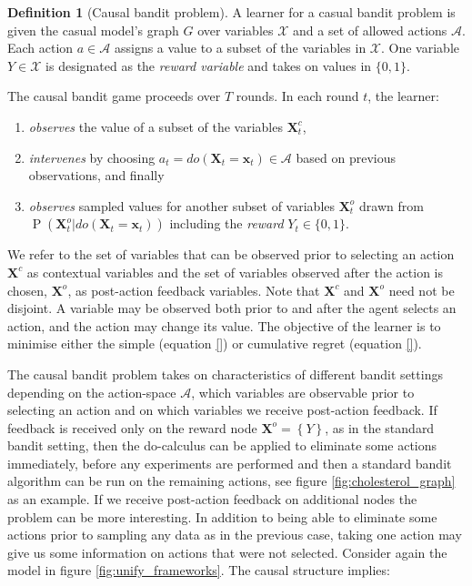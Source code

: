 \documentclass[11pt,a4paper,oneside]{book}
\newcommand{\actionspace}{\mathcal{A}}
\newcommand{\set}[1]{\left\{#1\right\}}
\renewcommand{\P}[1]{\operatorname{P}\left(#1\right)}
\renewcommand{\vec}[1]{\boldsymbol{#1}}
\theoremstyle{plain}
\theoremstyle{definition}
\newtheorem{definition}[theorem]{Definition}
\begin{document}
\vspace*{.5cm}
\begin{definition}[Causal bandit problem]
A learner for a casual bandit problem is given the casual model’s graph $G$ over variables $\mathcal{X}$ and a set of allowed actions $\actionspace$. Each action $a \in \actionspace$ assigns a value to a subset of the variables in $\mathcal{X}$. One variable $Y \in \mathcal{X}$ is designated as the \emph{reward variable} and takes on values in $\{0, 1\}$.

The causal bandit game proceeds over $T$ rounds. In each round $t$, the learner:
\begin{enumerate}
\item \emph{observes} the value of a subset of the variables $\vec{X}^c_t$,
\item \emph{intervenes} by choosing $a_t = do(\vec{X}_t = \vec{x}_t) \in \mathcal{A}$ based on previous observations, and finally
\item \emph{observes} sampled values for another subset of variables $\vec{X}^o_t$ drawn from $\P{\vec{X}^o_t | do(\vec{X}_t = \vec{x}_t)}$ including the \emph{reward} $Y_t \in \{0,1\}$.
\end{enumerate} 

We refer to the set of variables that can be observed prior to selecting an action $\vec{X}^c$ as contextual variables and the set of variables observed after the action is chosen, $\vec{X}^o$, as post-action feedback variables. Note that $\vec{X}^c$ and $\vec{X}^o$ need not be disjoint. A variable may be observed both prior to and after the agent selects an action, and the action may change its value. The objective of the learner is to minimise either the simple (equation \ref{}) or cumulative regret (equation \ref{}). 

\end{definition}

The causal bandit problem takes on characteristics of different bandit settings depending on the action-space $\actionspace$, which variables are observable prior to selecting an action and on which variables we receive post-action feedback. If feedback is received only on the reward node $\vec{X}^o = \set{Y}$, as in the standard bandit setting, then the do-calculus can be applied to eliminate some actions immediately, before any experiments are performed and then a standard bandit algorithm can be run on the remaining actions, see figure \ref{fig:cholesterol_graph} as an example. If we receive post-action feedback on additional nodes the problem can be more interesting. In addition to being able to eliminate some actions prior to sampling any data as in the previous case, taking one action may give us some information on actions that were not selected. Consider again the model in figure \ref{fig:unify_frameworks}. The causal structure implies: 
\end{document}
